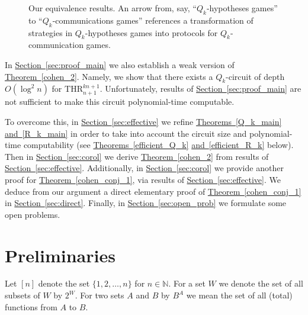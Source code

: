 \documentclass[11pt]{article}
\numberwithin{equation}{section}
\theoremstyle{definition}
\theoremstyle{plain}
\newcommand{\expref}[2]{\hyperref[#2]{#1~\ref{#2}}}
\def\THR{\mathrm{THR}}
\begin{document}
\begin{figure}[h!]
{
}
\caption{Our equivalence results. An arrow from, say, ``$Q_k$-hypotheses games'' to ``$Q_k$-communications games'' references a transformation of strategies in $Q_k$-hypotheses games into protocols for $Q_k$-communication games.}
\end{figure}

In \expref{Section}{sec:proof_main} we also establish a weak version of \expref{Theorem}{cohen_2}. Namely, we show that there exists 
%
a $Q_k$-circuit of depth $O(\log^2n)$  %
for $\THR^{kn+1}_{n+1}$. Unfortunately, results of \expref{Section}{sec:proof_main} are not sufficient to make this circuit polynomial-time computable.

To overcome this, in \expref{Section}{sec:effective} we refine \expref{Theorems}{Q_k_main} \expref{and}{R_k_main} in order to take into account the circuit size and polynomial-time computability (see \expref{Theorems}{efficient_Q_k} \expref{and}{efficient_R_k} below). Then in \expref{Section}{sec:corol} we derive \expref{Theorem}{cohen_2} from results of \expref{Section}{sec:effective}. Additionally, in \expref{Section}{sec:corol} we provide another proof for \expref{Theorem}{cohen_conj_1}, via results of \expref{Section}{sec:effective}.
We deduce from our argument a direct elementary proof of \expref{Theorem}{cohen_conj_1} in \expref{Section}{sec:direct}. Finally, in \expref{Section}{sec:open_prob} we formulate some open problems.















\section{Preliminaries} \label{sec:prelim}
Let $[n]$ denote the set $\{1, 2, \ldots, n\}$ for $n\in\mathbb{N}$. For a set $W$ we denote the set of all subsets of $W$ by $2^W$. For two sets $A$ and $B$ by $B^A$ we mean the set of all (total) functions from $A$ to $B$.
\end{document}
